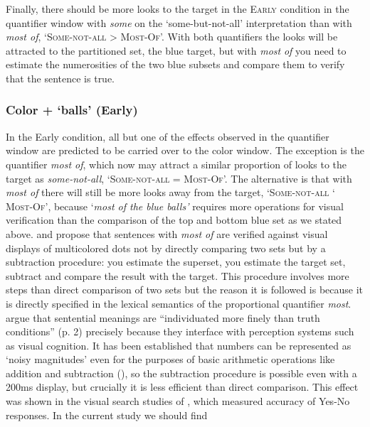 \documentclass[output=paper]{langscibook}
\begin{document}
Finally, there should be more looks to the target in the \textsc{Early} condition in the quantifier window with \textit{some} on
the `some-but-not-all' interpretation than with \textit{most of}, `\textsc{Some-not-all} {\textgreater}
\textsc{Most-Of}'. With both quantifiers the looks will be attracted to the partitioned set, the blue target, but with
\textit{most} \textit{of} you need to estimate the numerosities of the two blue subsets and compare them to verify that
the sentence is true.


\subsubsection{Color + `balls' (Early)}

In the Early condition, all but one of the effects observed in the quantifier window are predicted to be carried over to
the color window. The exception is the quantifier \textit{most of}, which now may attract a similar proportion of looks
to the target as \textit{some-not-all}, `\textsc{Some-not-all} = \textsc{Most-Of}'. The alternative is that with
\textit{most of} there will still be more looks away from the target, `\textsc{Some-not-all} `
\textsc{Most-Of}', because `\textit{most of the blue balls'} requires more operations for
visual verification than the comparison of the top and bottom blue set as we stated above. \citet{pietroski2009meaning} and \citet{lidz2011interface} propose that sentences with \textit{most of} are verified against visual displays of
multicolored dots not by directly comparing two sets but by a subtraction procedure: you estimate the superset, you
estimate the target set, subtract and compare the result with the target. This procedure involves more steps than
direct comparison of two sets but the reason it is followed is because it is directly specified in the lexical
semantics of the proportional quantifier \textit{most}. \citet{lidz2011interface} argue that sentential meanings are
“individuated more finely than truth conditions” (p. 2) precisely because they interface with perception systems such
as visual cognition. It has been established that numbers can be represented as ‘noisy magnitudes’ even for the
purposes of basic arithmetic operations like addition and subtraction (\citealt{feigenson2004core,degen2011making}), so the
subtraction procedure is possible even with a 200ms display, but crucially it is less efficient than direct comparison.
This effect was shown in the visual search studies of 
\citet{pietroski2009meaning,lidz2011interface,tomaszewicz2011verification,tomaszewicz2012semantics,tomaszewicz2013linguistic,hunter2017verification, Knowlton2021}, which measured accuracy of Yes-No responses. In the current study we should find
\end{document}
